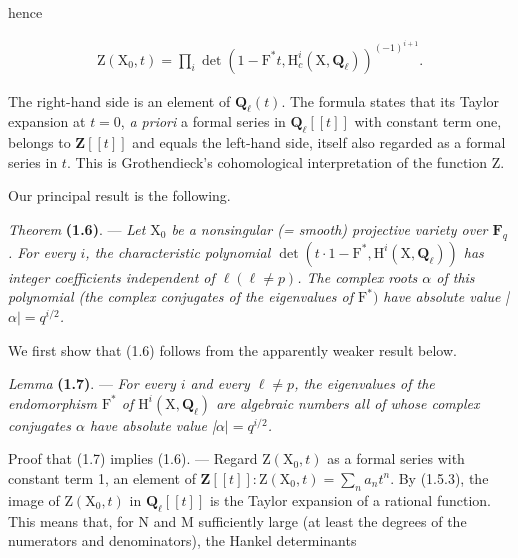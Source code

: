 \documentclass[10pt,leqno]{article}
\begin{document}
\noindent hence\par

\begin{equation*}\begin{gathered}\mathrm{Z}(\mathrm{X}_{0},t) = \prod _{i} \operatorname{det}(1- \mathrm{F}^{*}t,\mathrm{H}_{c}^{i}(\mathrm{X},\mathbf{Q}_{\ell }))^{(- 1)^{i+1}}.\end{gathered}\tag{1.5.4}\end{equation*}

\noindent The right-hand side is an element of \(\mathbf{Q}_{\ell }(t)\). The formula states that its Taylor expansion at \(t=0\), \emph{a priori} a formal series in \(\mathbf{Q}_{\ell }[[t]]\) with constant term one, belongs to \(\mathbf{Z}[[t]]\) and equals the left-hand side, itself also regarded as a formal series in \(t\). This is Grothendieck’s cohomological interpretation of the function \(\mathrm{Z}\).\par

\noindent Our principal result is the following.\par

\noindent \emph{Theorem} \textbf{(1.6)}. — {\itshape Let \(\mathrm{X}_{0}\) be a nonsingular (= smooth) projective variety over \(\mathbf{F}_{q}\). For every \(i\), the characteristic polynomial \(\operatorname{det}(t\cdot 1- \mathrm{F}^{*},\mathrm{H}^{i}(\mathrm{X},\mathbf{Q}_{\ell }))\) has integer coefficients independent of \(\ell  (\ell \ne p)\). The complex roots \(\alpha \) of this polynomial (the complex conjugates of the eigenvalues of \(\mathrm{F}^{*})\) have absolute value |\(\alpha |=q^{i/2}\).}\par

\noindent We first show that (1.6) follows from the apparently weaker result below.\par

\noindent \emph{Lemma} \textbf{(1.7)}. — {\itshape For every \(i\) and every \(\ell \ne p\), the eigenvalues of the endomorphism \(\mathrm{F}^{*}\) of \(\mathrm{H}^{i}(\mathrm{X},\mathbf{Q}_{\ell })\) are algebraic numbers all of whose complex conjugates \(\alpha \) have absolute value |\(\alpha |=q^{i/2}\).}\par

\noindent Proof that (1.7) implies (1.6). — Regard \(\mathrm{Z}(\mathrm{X}_{0},t)\) as a formal series with constant term 1, an element of \(\mathbf{Z}[[t]]: \mathrm{Z}(\mathrm{X}_{0},t)=\sum _{n} a_{n} t^{n}\). By (1.5.3), the image of \(\mathrm{Z}(\mathrm{X}_{0},t)\) in \(\mathbf{Q}_{\ell }[[t]]\) is the Taylor expansion of a rational function. This means that, for \(\mathrm{N}\) and \(\mathrm{M}\) sufficiently large (at least the degrees of the numerators and denominators), the Hankel determinants\par
\end{document}
